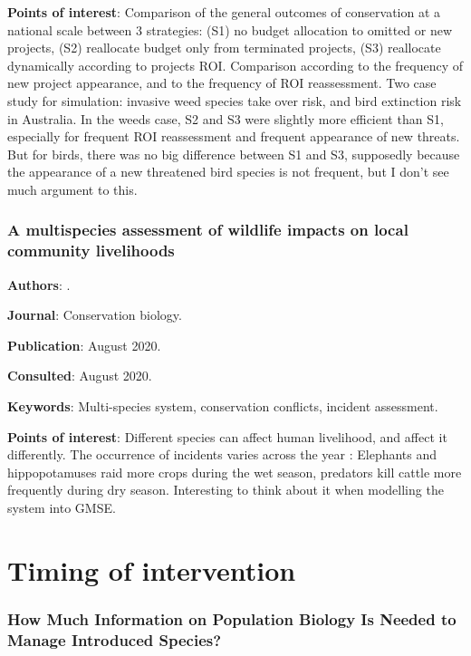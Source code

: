 \documentclass[12pt,a4paper]{article}
\begin{document}
\textbf{Points of interest}: Comparison of the general outcomes of conservation at a national scale between 3 strategies: (S1) no budget allocation to omitted or new projects, (S2) reallocate budget only from terminated projects, (S3) reallocate dynamically according to projects ROI. Comparison according to the frequency of new project appearance, and to the frequency of ROI reassessment. Two case study for simulation: invasive weed species take over risk, and bird extinction risk in Australia. In the weeds case, S2 and S3 were slightly more efficient than S1, especially for frequent ROI reassessment and frequent appearance of new threats. But for birds, there was no big difference between S1 and S3, supposedly because the appearance of a new threatened bird species is not frequent, but I don't see much argument to this.

\newpage

\subsubsection*{A multispecies assessment of wildlife impacts on local community livelihoods}

\textbf{Authors}: \cite{pozo2020multispecies}.

\textbf{Journal}: Conservation biology.

\textbf{Publication}: August 2020.

\textbf{Consulted}: August 2020.

\textbf{Keywords}: Multi-species system, conservation conflicts, incident assessment.

\textbf{Points of interest}: Different species can affect human livelihood, and affect it differently. The occurrence of incidents varies across the year : Elephants and hippopotamuses raid more crops during the wet season, predators kill cattle more frequently during dry season. Interesting to think about it when modelling the system into GMSE.

\newpage

\section*{Timing of intervention}

\subsubsection*{How Much Information on Population Biology Is Needed to Manage Introduced Species?}
\end{document}
